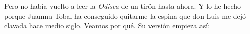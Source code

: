 \documentclass[11pt,a4paper]{article}
\begin{document}
Pero no había vuelto a leer la \emph{Odisea} de un tirón hasta ahora. Y lo he hecho porque Juanma Tobal ha conseguido quitarme la espina que don Luis me dejó clavada hace medio siglo. Veamos por qué. Su versión empieza así:
%
%
\end{document}
